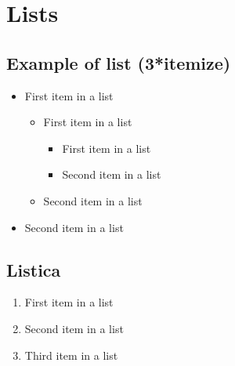 \documentclass[paper=a4, fontsize=11pt]{scrartcl} %
\numberwithin{equation}{section} %
\numberwithin{figure}{section} %
\numberwithin{table}{section} %
\begin{document}

\section{Lists}


\subsection{Example of list (3*itemize)}
\begin{itemize}
	\item First item in a list 
		\begin{itemize}
		\item First item in a list 
			\begin{itemize}
			\item First item in a list 
			\item Second item in a list 
			\end{itemize}
		\item Second item in a list 
		\end{itemize}
	\item Second item in a list 
\end{itemize}


\subsection{Listica}
\begin{enumerate}
\item First item in a list 
\item Second item in a list 
\item Third item in a list
\end{enumerate}
\end{document}
